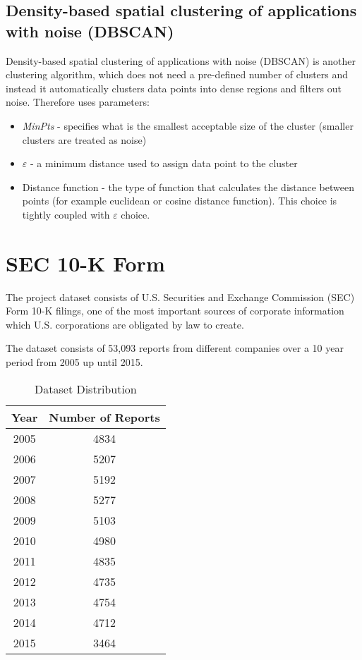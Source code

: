 \subsection{Density-based spatial clustering of applications with noise (DBSCAN)}
Density-based spatial clustering of applications with noise (DBSCAN) \cite{dbscanwiki} is another clustering algorithm, which does not need a pre-defined number of clusters and instead it automatically clusters data points into dense regions and filters out noise. Therefore uses parameters: 
\begin{itemize}
\item \textit{MinPts} - specifies what is the smallest acceptable size of the cluster (smaller clusters are treated as noise)
\item $\varepsilon$ - a minimum distance used to assign data point to the cluster
\item Distance function - the type of function that calculates the distance between points (for example euclidean or cosine distance function). This choice is tightly coupled with $\varepsilon$ choice.
\end{itemize}

\section{SEC 10-K Form}
The project dataset consists of U.S. Securities and Exchange Commission (SEC) Form 10-K filings, one of the most important sources of corporate information which U.S. corporations are obligated by law to create.

The dataset consists of 53,093 reports from different companies over a 10 year period from 2005 up until 2015.

\begin{table}[H]
\centering
\begin{tabular}{|c|c|}
\hline
Year & Number of Reports \\
\hline
2005 & 4834\\\hline
2006 & 5207\\\hline
2007 & 5192\\\hline
2008 & 5277\\\hline
2009 & 5103\\\hline
2010 & 4980\\\hline
2011 & 4835\\\hline
2012 & 4735\\\hline
2013 & 4754\\\hline
2014 & 4712\\\hline
2015 & 3464\\\hline
\end{tabular}
\caption{Dataset Distribution}
\label{table:1}
\end{table}

